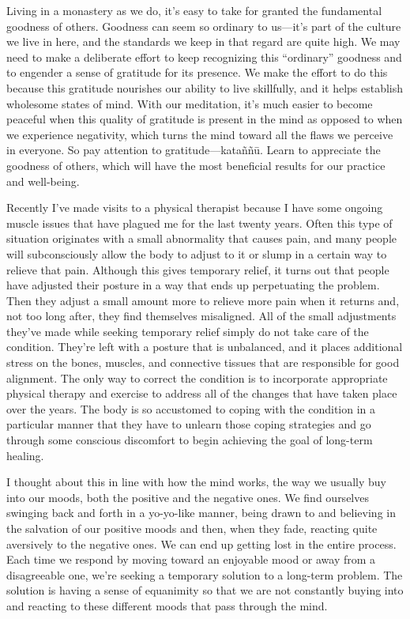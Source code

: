 Living in a monastery as we do, it's easy to take for granted the 
fundamental goodness of others. Goodness can seem so ordinary to 
us---it's part of the culture we live in here, and the standards we 
keep in that regard are quite high. We may need to make a deliberate 
effort to keep recognizing this ``ordinary'' goodness and to engender a 
sense of gratitude for its presence. We make the effort to do this 
because this gratitude nourishes our ability to live skillfully, and it 
helps establish wholesome states of mind. With our meditation, it's 
much easier to become peaceful when this quality of gratitude is 
present in the mind as opposed to when we experience negativity, which 
turns the mind toward all the flaws we perceive in everyone. So pay 
attention to gratitude---kataññū. Learn to appreciate the goodness 
of others, which will have the most beneficial results for our practice 
and well-being.


Recently I've made visits to a physical therapist because I have some 
ongoing muscle issues that have plagued me for the last twenty years. 
Often this type of situation originates with a small abnormality that 
causes pain, and many people will subconsciously allow the body to 
adjust to it or slump in a certain way to relieve that pain. Although 
this gives temporary relief, it turns out that people have adjusted 
their posture in a way that ends up perpetuating the problem. Then they 
adjust a small amount more to relieve more pain when it returns and, 
not too long after, they find themselves misaligned. All of the small 
adjustments they've made while seeking temporary relief simply do not 
take care of the condition. They're left with a posture that is 
unbalanced, and it places additional stress on the bones, muscles, and 
connective tissues that are responsible for good alignment. The only 
way to correct the condition is to incorporate appropriate physical 
therapy and exercise to address all of the changes that have taken 
place over the years. The body is so accustomed to coping with the 
condition in a particular manner that they have to unlearn those coping 
strategies and go through some conscious discomfort to begin achieving 
the goal of long-term healing.

I thought about this in line with how the mind works, the way we 
usually buy into our moods, both the positive and the negative ones. We 
find ourselves swinging back and forth in a yo-yo-like manner, being 
drawn to and believing in the salvation of our positive moods and then, 
when they fade, reacting quite aversively to the negative ones. We can 
end up getting lost in the entire process. Each time we respond by 
moving toward an enjoyable mood or away from a disagreeable one, we're 
seeking a temporary solution to a long-term problem. The solution is 
having a sense of equanimity so that we are not constantly buying into 
and reacting to these different moods that pass through the mind.

